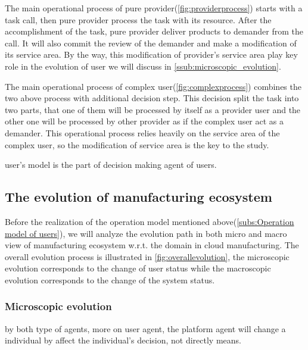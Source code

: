 The main operational process of pure provider(\autoref{fig:providerprocess}) starts with a task call, then pure provider process the task with its resource. After the accomplishment of the task, pure provider deliver products to demander from the call. It will also commit the review of the demander and make a modification of its service area. By the way, this modification of provider's service area play key role in the evolution of user we will discuss in \autoref{ssub:microscopic_evolution}.  

The main operational process of complex user(\autoref{fig:complexprocess}) combines the two above process with additional decision step. This decision split the task into two parts, that one of them will be processed by itself as a provider user and the other one will be processed by other provider as if the complex user act as a demander. This operational process relies heavily on the service area of the complex user, so the modification of service area is the key to the study.

user's model is the part of decision making agent of users.



\subsection{The evolution of manufacturing ecosystem} %
\label{sub:the_evolution_of_manufacturing_ecosystem}
Before the realization of the operation model mentioned above(\autoref{subs:Operation model of users}), we will analyze the evolution path in both micro and macro view of manufacturing ecosystem w.r.t. the domain in cloud manufacturing. The overall evolution process is illustrated in \autoref{fig:overallevolution},
the microscopic evolution corresponds to the change of user status while the macroscopic evolution corresponds to the change of the system status.

\subsubsection{Microscopic evolution} %
\label{ssub:microscopic_evolution}

by both type of agents, more on user agent, the platform agent will change a individual by affect the individual's decision, not directly means.


